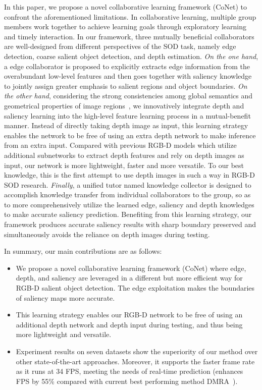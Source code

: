 \documentclass[runningheads]{llncs}
\begin{document}
In this paper, we propose a novel collaborative learning framework (CoNet) to confront the aforementioned limitations.
In collaborative learning, multiple group members work together to achieve learning goals through exploratory learning and timely interaction.
In our framework, three mutually beneficial collaborators are well-designed from different perspectives of the SOD task, namely edge detection, coarse salient object detection, and depth estimation.
\emph{On the one hand}, a edge collaborator is proposed to explicitly extracts edge information from the overabundant low-level features and then goes together with saliency knowledge to jointly assign greater emphasis to salient regions and object boundaries.
\emph{On the other hand}, considering the strong consistencies among global semantics and geometrical properties of image regions~\cite{Towards},
we innovatively integrate depth and saliency learning into the high-level feature learning process in a mutual-benefit manner.
Instead of directly taking depth image as input,
this learning strategy enables the network to be free of using an extra depth network to make inference from an extra input.
Compared with previous RGB-D models which utilize additional subnetworks to extract depth features and rely on depth images as input, our network is more lightweight, faster and more versatile.
To our best knowledge, this is the first attempt to use depth images in such a way in RGB-D SOD research.
\emph{Finally}, a unified tutor named knowledge collector is designed to accomplish knowledge transfer from individual collaborators to the group, so as to more comprehensively utilize the learned edge, saliency and depth knowledges to make accurate saliency prediction.
Benefiting from this learning strategy, our framework produces accurate saliency results with sharp boundary preserved and simultaneously avoids the reliance on depth images during testing.

In summary, our main contributions are as follows:
\begin{itemize}
\setlength{\itemsep}{1pt}
\setlength{\parsep}{0pt}
\setlength{\parskip}{0pt}
\item We propose a novel collaborative learning framework (CoNet) where edge, depth, and saliency are leveraged in a different but more efficient way for RGB-D salient object detection.
The edge exploitation makes the boundaries of saliency maps more accurate.
\item This learning strategy enables our RGB-D network to be free of using an additional depth network and depth input during testing, and thus being more lightweight and versatile.
\item Experiment results on seven datasets show the superiority of our method over other state-of-the-art approaches.
Moreover, it supports the faster frame rate as it runs at 34 FPS, meeting the needs of real-time prediction (enhances FPS by 55\% compared with current best performing method DMRA~\cite{3DDMRA}). 
\end{itemize}
\end{document}
